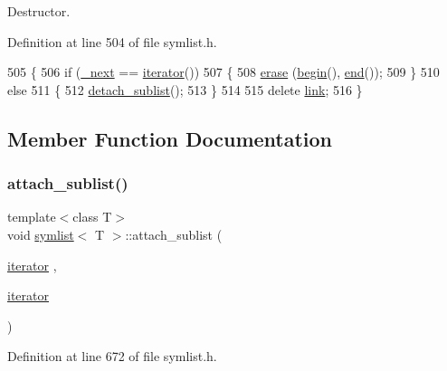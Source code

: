 Destructor. 



Definition at line 504 of file symlist.\+h.


\begin{DoxyCode}
505 \{
506     \textcolor{keywordflow}{if} (\mbox{\hyperlink{classsymlist_a376c701eae20490b74a6866124bcb24c}{\_next}} == \mbox{\hyperlink{classsymlist_a66045fbe3d98975e5537092ede8b50df}{iterator}}())
507     \{
508     \mbox{\hyperlink{classsymlist_a75fc1fc7db7b20cc430ddb8577608904}{erase}} (\mbox{\hyperlink{classsymlist_a525b8d44af5d771fe15916372515cce0}{begin}}(), \mbox{\hyperlink{classsymlist_a7283589fa01f79d722f8256d7a6a7883}{end}}());
509     \}
510     \textcolor{keywordflow}{else}
511     \{
512     \mbox{\hyperlink{classsymlist_a784f81bf9dfbfc1865f188a82681779f}{detach\_sublist}}();
513     \}
514     
515     \textcolor{keyword}{delete} \mbox{\hyperlink{classsymlist_a8fa81a7f6d0bb986bb593776db582c90}{link}};
516 \}
\end{DoxyCode}


\subsection{Member Function Documentation}
\mbox{\label{classsymlist_a526206a1d6fd2f2cef9f73ec499b6315}} 
\subsubsection{\texorpdfstring{attach\+\_\+sublist()}{attach\_sublist()}}
{\footnotesize\ttfamily template$<$class T$>$ \\
void \mbox{\hyperlink{classsymlist}{symlist}}$<$ T $>$\+::attach\+\_\+sublist (\begin{DoxyParamCaption}\item[{\mbox{\hyperlink{classsymlist_a66045fbe3d98975e5537092ede8b50df}{iterator}}}]{,  }\item[{\mbox{\hyperlink{classsymlist_a66045fbe3d98975e5537092ede8b50df}{iterator}}}]{ }\end{DoxyParamCaption})}



Definition at line 672 of file symlist.\+h.


